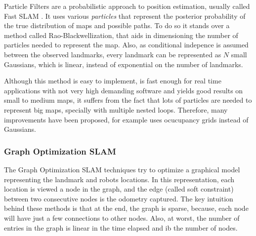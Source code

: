       Particle Filters are a probabilistic approach to position estimation, usually called Fast SLAM \cite{Montemerlo2002}. It uses various \textit{particles} that represent the posterior probability of the true distribution of maps and possible paths. To do so it stands over a method called Rao-Blackwellization, that aids in dimensioning the number of particles needed to represent the map. Also, as conditional indepence is assumed between the observed landmarks, every landmark can be represented as $N$ small Gaussians, which is linear, instead of exponential on the number of landmarks.

      Although this method is easy to implement, is fast enough for real time applications with not very high demanding software and yields good results on small to medium maps, it suffers from the fact that lots of particles are needed to represent big maps, specially with multiple nested loops. Therefore, many improvements have been proposed, \cite{Grisetti2007} for example uses ocucupancy grids instead of Gaussians.

    \subsubsection{Graph Optimization SLAM}

      The Graph Optimization SLAM techniques try to optimize a graphical model representing the landmark and robots locations. In this representation, each location is viewed a node in the graph, and the edge (called soft constraint) between two consecutive nodes is the odometry captured. The key intuition behind these methods is that at the end, the graph is sparse, because, each node will have just a few connections to other nodes. Also, at worst, the number of entries in the graph is linear in the time elapsed and ib the number of nodes.


  \begin{comment}
    \begin{itemize}
    \end{itemize}
  \end{comment}
